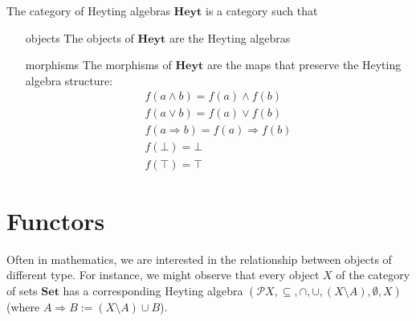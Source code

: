 \begin{definition}
    The category of Heyting algebras $\mathbf{Heyt}$ is a category such that
    \begin{itemize}
        \item[objects] The objects of $\mathbf{Heyt}$ are the Heyting algebras
        \item[morphisms] The morphisms of $\mathbf{Heyt}$ are the maps that preserve the Heyting algebra structure:
        \begin{gather*}
            f(a\wedge b)=f(a)\wedge f(b)\\
            f(a\vee b)=f(a)\vee f(b)\\
            f(a\Rightarrow b)=f(a)\Rightarrow f(b)\\
            f(\bot)=\bot\\
            f(\top)=\top
        \end{gather*}
    \end{itemize}
\end{definition}
\section{Functors}
Often in mathematics, we are interested in the relationship between objects of different type.
For instance, we might observe that every object $X$ of the category of sets $\mathbf{Set}$
has a corresponding Heyting algebra $(\mathcal{P}X,\subseteq,\cap,\cup,(X\setminus A),\emptyset,X)$
(where $A\Rightarrow B:=(X\setminus A)\cup B$).

